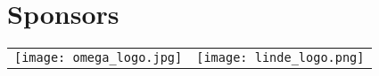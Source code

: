 
\section*{Sponsors}

\begin{tabular}{ll}
\texttt{[image: omega\_logo.jpg]}
&
\texttt{[image: linde\_logo.png]}
\end{tabular}